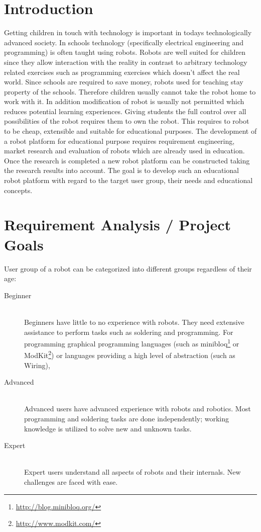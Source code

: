 \chapter{Introduction}
Getting children in touch with technology is important in todays technologically advanced society. In schools technology (specifically electrical engineering and programming) is often taught using robots. Robots are well suited for children since they allow interaction with the reality in contrast to arbitrary technology related exercises such as programming exercises which doesn't affect the real world.\cite[pp.16]{johnson2003children}\newline 
Since schools are required to save money, robots used for teaching stay property of the schools. Therefore children usually cannot take the robot home to work with it. In addition modification of robot is usually not permitted which reduces potential learning experiences. Giving students the full control over all possibilities of the robot requires them to own the robot. This requires to robot to be cheap, extensible and suitable for educational purposes.\newline
The development of a robot platform for educational purpose requires requirement engineering, market research and evaluation of robots which are already used in education. Once the research is completed a new robot platform can be constructed taking the research results into account. The goal is to develop such an educational robot platform with regard to the target user group, their needs and educational concepts.
\chapter{Requirement Analysis / Project Goals}
User group of a robot can be categorized into different groups regardless of their age:
\begin{description}
\item[Beginner] \hfill \\ Beginners have little to no experience with robots. They need extensive assistance to perform tasks such as soldering and programming. For programming graphical programming languages (such as minibloq\footnote{\url{http://blog.minibloq.org/}} or ModKit\footnote{\url{http://www.modkit.com/}}) or languages providing a high level of abstraction (such as Wiring), 
\item[Advanced] \hfill \\ Advanced users have advanced experience with robots and robotics. Most programming and soldering tasks are done independently; working knowledge is utilized to solve new and unknown tasks.  
\item[Expert] \hfill \\ Expert users understand all aspects of robots and their internals. New challenges are faced with ease.
\end{description}

